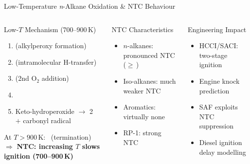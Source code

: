 \documentclass[aspectratio=169,10pt]{beamer}
\newcommand{\rxn}[1]{{\small\ttfamily\color{ITUsky}#1}}
\newcommand{\hl}[1]{{\bfseries\color{ITUgold}#1}}
\newcommand{\redbf}[1]{{\bfseries\color{ITUred}#1}}
\begin{document}
\begin{frame}{Low-Temperature \textit{n}-Alkane Oxidation \& NTC Behaviour}
  \begin{columns}[t]
    \begin{block}{Low-$T$ Mechanism (700--900\,K)}
      \begin{enumerate}\small
        \item \rxn{}\quad(alkylperoxy formation)
        \item \rxn{}\quad(intramolecular H-transfer)
        \item \rxn{}\quad(2nd O$_2$ addition)
        \item \rxn{}\quad\redbf{(branching!)}
        \item Keto-hydroperoxide $\to$ 2\, $+$ carbonyl radical
      \end{enumerate}
      \smallskip
      \small At $T>900\,\mathrm{K}$:
      \ (termination)\\[3pt]
      $\Rightarrow$ \hl{NTC: increasing $T$ slows ignition (700--900\,K)}
    \end{block}
    \begin{block}{NTC Characteristics}
      \begin{itemize}
        \item $n$-alkanes: pronounced NTC ($\geq$\,)
        \item Iso-alkanes: much weaker NTC
        \item Aromatics: virtually none
        \item RP-1: strong NTC
      \end{itemize}
    \end{block}
    \begin{alertblock}{Engineering Impact}
      \begin{itemize}
        \item HCCI/SACI: two-stage ignition
        \item Engine knock prediction
        \item SAF exploits NTC suppression
        \item Diesel ignition delay modelling
      \end{itemize}
    \end{alertblock}
  \end{columns}
\end{frame}
\end{document}
